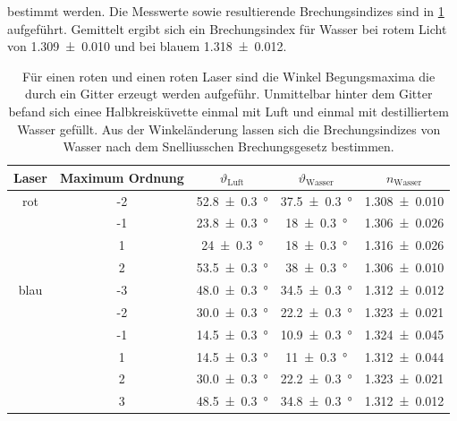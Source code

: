 \documentclass[
	a4paper,
	12pt,
	pagesize,
	ngerman
]{scrartcl}
\begin{document}
	bestimmt werden.
	Die Messwerte sowie resultierende Brechungsindizes sind in \cref{tab_wasser} aufgeführt.
	Gemittelt ergibt sich ein Brechungsindex für Wasser bei rotem Licht von \SI{1,309 +- 0,010}{} und bei blauem \SI{1,318 +- 0,012}{}.
	\begin{table}[H] %
		\centering
		\begin{tabular}{ c | c | c | c | c}
			Laser & Maximum Ordnung & $\vartheta_\text{Luft}$ & $\vartheta_\text{Wasser}$ & $n_\text{Wasser}$ \\ \hline
			rot & -2 &\SI{52,8 +- 0,3}{\degree} & \SI{37,5 +-0,3}{\degree} & \SI{1,308 +- 0,010}{}\\
			& -1 &\SI{23,8 +- 0,3}{\degree} & \SI{18+-0,3}{\degree} & \SI{1,306 +- 0,026}{}\\
			& 1 &\SI{24 +- 0,3}{\degree} & \SI{18+-0,3}{\degree} & \SI{1,316 +- 0,026}{}\\
			& 2 &\SI{53,5 +- 0,3}{\degree} & \SI{38+-0,3}{\degree} & \SI{1,306 +- 0,010}{}\\ \hline
			blau & -3 & \SI{48,0 +- 0,3}{\degree}&\SI{34,5+-0,3}{\degree}& \SI{1,312 +- 0,012}{} \\
			& -2 & \SI{30,0 +- 0,3}{\degree}&\SI{22,2+-0,3}{\degree}& \SI{1,323 +- 0,021}{} \\
			& -1 & \SI{14,5 +- 0,3}{\degree}&\SI{10,9+-0,3}{\degree}& \SI{1,324 +- 0,045}{} \\
			& 1 & \SI{14,5 +- 0,3}{\degree}&\SI{11+-0,3}{\degree}& \SI{1,312 +- 0,044}{} \\
			& 2 & \SI{30,0 +- 0,3}{\degree}&\SI{22,2+-0,3}{\degree}& \SI{1,323 +- 0,021}{} \\
			& 3 & \SI{48,5 +- 0,3}{\degree}&\SI{34,8+-0,3}{\degree}& \SI{1,312 +- 0,012}{} \\

		\end{tabular}
		\caption{Für einen roten und einen roten Laser sind die Winkel Begungsmaxima die durch ein Gitter erzeugt werden aufgeführ. Unmittelbar hinter dem Gitter befand sich einee Halbkreisküvette einmal mit Luft und einmal mit destilliertem Wasser gefüllt. Aus der Winkeländerung lassen sich die Brechungsindizes von Wasser nach dem Snelliusschen Brechungsgesetz bestimmen.} %
		\label{tab_wasser}
	\end{table}
	
\end{document}
